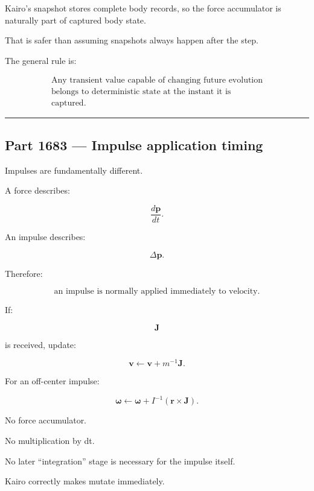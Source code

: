 Kairo's snapshot stores complete body records, so the force accumulator is naturally part of captured body state.

That is safer than assuming snapshots always happen after the step.

The general rule is:

\[\boxed{\begin{gathered}\text{Any transient value capable of changing future evolution}\\\text{belongs to deterministic state at the instant it is}\\\text{captured.}\end{gathered}}\]

\begin{center}\rule{0.5\linewidth}{0.5pt}\end{center}

\subsection{Part 1683 --- Impulse application timing}\label{06-engine-ii-ch038-part-1683-impulse-application-timing}

\hypertarget{06-engine-ii-ch038-part-1683-impulse-application-timing}{}

Impulses are fundamentally different.

A force describes:

\[
\frac{d\mathbf p}{dt}.
\]

An impulse describes:

\[
\Delta\mathbf p.
\]

Therefore:

\[
\boxed{
\text{an impulse is normally applied immediately to velocity.}
}
\]

If:

\[
\mathbf J
\]

is received, update:

\[
\mathbf v
\leftarrow
\mathbf v+m^{-1}\mathbf J.
\]

For an off-center impulse:

\[
\boldsymbol\omega
\leftarrow
\boldsymbol\omega+
I^{-1}
(\mathbf r\times\mathbf J).
\]

No force accumulator.

No multiplication by dt.

No later ``integration'' stage is necessary for the impulse itself.

Kairo correctly makes  mutate  immediately.

